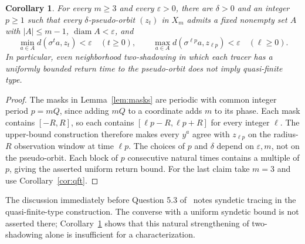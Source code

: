 \documentclass[11pt]{article}
\newtheorem{corollary}[theorem]{Corollary}
\newcommand{\diam}{\operatorname{diam}}
\begin{document}
\begin{corollary}\label{cor:returns}
For every $m\geq3$ and every $\varepsilon>0$, there are $\delta>0$
and an integer $p\geq1$ such that every $\delta$-pseudo-orbit $(z_t)$
in $X_m$ admits a fixed nonempty set $A$ with $|A|\leq m-1$,
$\diam A<\varepsilon$, and
\[
 \min_{a\in A}d(\sigma^t a,z_t)<\varepsilon\quad(t\geq0),
 \qquad
 \max_{a\in A}d(\sigma^{\ell p}a,z_{\ell p})<\varepsilon
 \quad(\ell\geq0).
\]
In particular, even neighborhood two-shadowing in which each tracer
has a uniformly bounded return time to the pseudo-orbit does not imply
quasi-finite type.
\end{corollary}
\begin{proof}
The masks in Lemma~\ref{lem:masks} are periodic with common integer
period $p=mQ$, since adding $mQ$ to a coordinate adds $m$ to its phase.
Each mask contains $[-R,R]$, so each contains
$[\ell p-R,\ell p+R]$ for every integer $\ell$.
The upper-bound construction therefore makes every $y^a$ agree with
$z_{\ell p}$ on the radius-$R$ observation window at time $\ell p$.
The choices of $p$ and $\delta$ depend on $\varepsilon,m$, not on
the pseudo-orbit. Each block of $p$ consecutive natural times contains
a multiple of $p$, giving the asserted uniform return bound.
For the last claim take $m=3$ and use Corollary~\ref{cor:qft}.
\end{proof}

The discussion immediately before Question 5.3 of~\cite{MS} notes
syndetic tracing in the quasi-finite-type construction. The converse
with a uniform syndetic bound is not asserted there;
Corollary~\ref{cor:returns} shows that this natural strengthening of
two-shadowing alone is insufficient for a characterization.
\end{document}
